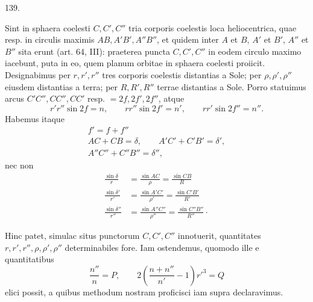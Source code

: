 \par{}\medskip
\begin{center}\hypertarget{native-186-article139}{}139.\end{center}
Sint in sphaera coelesti $C,C',C''$ tria corporis coelestis loca heliocentrica,
quae resp. in circulis maximis $AB,A'B',A''B''$, et quidem inter $A$ et $B$, $A'$ et
$B'$, $A''$ et $B''$ sita erunt (art. 64, III): praeterea puncta $C,C',C''$ in eodem circulo
maximo iacebunt, puta in eo, quem planum orbitae in sphaera coelesti
proiicit. Designabimus per $r,r',r''$ tres corporis coelestis distantias a Sole;
per $\rho,\rho',\rho''$ eiusdem distantias a terra; per $R,R',R''$ terrae distantias a Sole.
Porro statuimus arcus $C'C'',CC'',CC'$ resp. $=2f,2f',2f''$, atque
\[
r'r''\sin2f=n,\qquad rr''\sin2f'=n',\qquad rr'\sin2f''=n''.
\]
\hypertarget{native-187}{}Habemus itaque
\[
\begin{gathered}
f'=f+f''\\[.4ex]
AC+CB=\delta,\qquad A'C'+C'B'=\delta',\\[.4ex]
A''C''+C''B''=\delta'',
\end{gathered}
\]
nec non
\[
\begin{aligned}
\frac{\sin\delta}{r}&=\frac{\sin AC}{\rho}=\frac{\sin CB}{R}\\[.7ex]
\frac{\sin\delta'}{r'}&=\frac{\sin A'C'}{\rho'}=\frac{\sin C'B'}{R'}\\[.7ex]
\frac{\sin\delta''}{r''}&=\frac{\sin A''C''}{\rho''}=\frac{\sin C''B''}{R''}\mathpunct{\cdot}
\end{aligned}
\]

Hinc patet, simulac situs punctorum $C,C',C''$ innotuerit, quantitates $r,r',r'',\rho,\rho',\rho''$
determinabiles fore. Iam ostendemus, quomodo ille e quantitatibus
\[
\frac{n''}{n}=P,\qquad 2\left(\frac{n+n''}{n'}-1\right)r'^3=Q
\]
elici possit, a quibus methodum nostram proficisci iam supra declaravimus.
